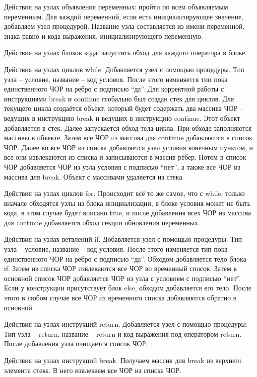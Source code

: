 Действия на узлах объявления переменных: пройти по всем объявляемым переменным. Для каждой переменной, если есть инициализирующее значение, добавляем узел процедурой. Название узла составляется из имени переменной, знака равно и кода выражения, инициализирующего переменную.

Действия на узлах блоков кода: запустить обход для каждого оператора в блоке.

Действия на узлах циклов while. Добавляется узел с помощью процедуры. Тип узла – условие, название – код условия. После этого изменяется тип пока единственного ЧОР на ребро с подписью “да”. Для корректной работы с инструкциями break и continue глобально был создан стек для циклов. Для текущего цикла создаётся объект, который будет содержать два массива ЧОР – ведущих в инструкцию break и ведущих в инструкцию continue. Этот объект добавляется в стек. Далее запускается обход тела цикла. При обходе заполняются массивы в объекте. Затем все ЧОР из массива для continue добавляются в список ЧОР. Далее во все ЧОР из списка добавляется узел условия конечным пунктом, и все они извлекаются из списка и записываются в массив рёбер. Потом в список ЧОР добавляется ЧОР из узла условия с подписью “нет”, а также все ЧОР из массива для break. Объект с массивами удаляется из стека.

Действия на узлах циклов for. Происходит всё то же самое, что с while, только вначале обходятся узлы из блока инициализации, в блоке условия может не быть кода, в этом случае будет вписано true, и после добавления всех ЧОР из массива для continue добавляется обход секции обновления переменных.

Действия на узлах ветвлений if. Добавляется узел с помощью процедуры. Тип узла – условие, название – код условия. После этого изменяется тип пока единственного ЧОР на ребро с подписью “да”. Обходом добавляется тело блока if. Затем из списка ЧОР извлекаются все ЧОР во временный список. Затем в основной список ЧОР добавляется ЧОР из узла с условием с подписью “нет”. Если у конструкции присутствует блок else, обходом добавляется его тело. После этого в любом случае все ЧОР из временного списка добавляются обратно в основной.

Действия на узлах инструкций return. Добавляется узел с помощью процедуры. Тип узла – return, название – return и код выражения под оператором return. После добавления узла очищается список ЧОР.

Действия на узлах инструкций break. Получаем массив для break из верхнего элемента стека. В него извлекаем все ЧОР из списка ЧОР.

